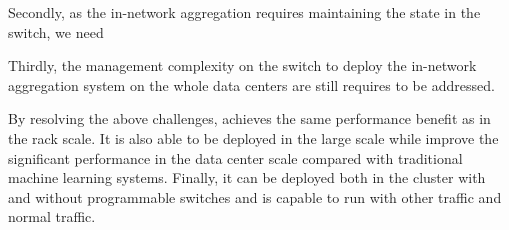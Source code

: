 Secondly, as the in-network aggregation requires maintaining the state in the switch, 
we need 

Thirdly, the management complexity on the switch to deploy 
the in-network aggregation system on the whole data centers 
are still requires to be addressed.



By resolving the above challenges, \system achieves the same performance benefit 
as \switchml in the rack scale. 
It is also able to be deployed in the large scale while improve the significant 
performance in the data center scale compared with traditional machine learning systems. 
Finally, it can be deployed both in the cluster with and without 
programmable switches and is capable to run with other \system traffic and normal traffic. 

